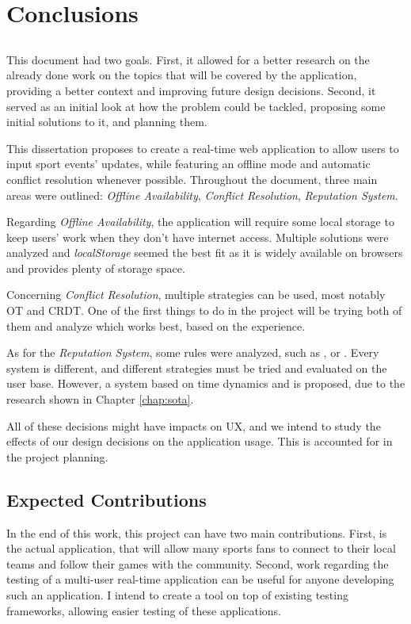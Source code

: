 \chapter{Conclusions} \label{chap:concl}

\section*{}

This document had two goals. First, it allowed for a better research on the already done work on the topics that will be covered by the application, providing a better context and improving future design decisions. Second, it served as an initial look at how the problem could be tackled, proposing some initial solutions to it, and planning them.

This dissertation proposes to create a real-time web application to allow users to input sport events' updates, while featuring an offline mode and automatic conflict resolution whenever possible. Throughout the document, three main areas were outlined: \textit{Offline Availability}, \textit{Conflict Resolution}, \textit{Reputation System}. 

Regarding \textit{Offline Availability}, the application will require some local storage to keep users' work when they don't have internet access. Multiple solutions were analyzed and \textit{localStorage} seemed the best fit as it is widely available on browsers and provides plenty of storage space.

Concerning \textit{Conflict Resolution}, multiple strategies can be used, most notably OT and CRDT. One of the first things to do in the project will be trying both of them and analyze which works best, based on the experience.

As for the \textit{Reputation System}, some rules were analyzed, such as , or . Every system is different, and different strategies must be tried and evaluated on the user base. However, a system based on time dynamics and  is proposed, due to the research shown in Chapter \ref{chap:sota}.

All of these decisions might have impacts on UX, and we intend to study the effects of our design decisions on the application usage. This is accounted for in the project planning.

\section{Expected Contributions}
In the end of this work, this project can have two main contributions. First, is the actual application, that will allow many sports fans to connect to their local teams and follow their games with the community. Second, work regarding the testing of a multi-user real-time application can be useful for anyone developing such an application. I intend to create a tool on top of existing testing frameworks, allowing easier testing of these applications.

\vspace*{12mm}